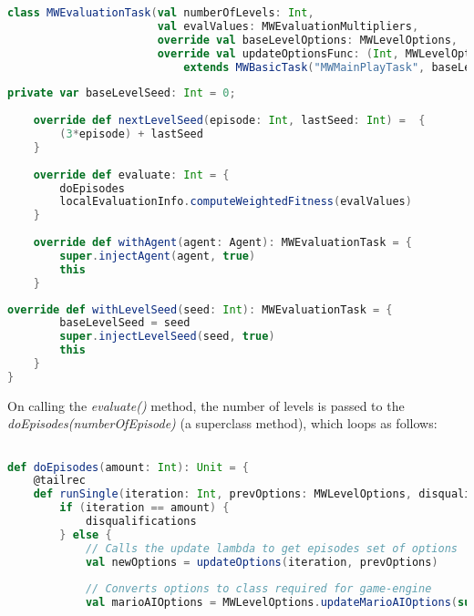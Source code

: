 \begin{minipage}{0.9\linewidth}
\centering
\begin{lstlisting}[language=scala]
class MWEvaluationTask(val numberOfLevels: Int, 
                       val evalValues: MWEvaluationMultipliers, 
                       override val baseLevelOptions: MWLevelOptions, 
                       override val updateOptionsFunc: (Int, MWLevelOptions) => MWLevelOptions)
                           extends MWBasicTask("MWMainPlayTask", baseLevelOptions, updateOptionsFunc, visualisation, args) with EvaluationTask {
\end{lstlisting}
\end{minipage}     
    
\begin{minipage}{0.9\linewidth}
\centering
\begin{lstlisting}[language=scala]  
    private var baseLevelSeed: Int = 0;
    
    override def nextLevelSeed(episode: Int, lastSeed: Int) =  {
        (3*episode) + lastSeed
    }    
        
    override def evaluate: Int = {
        doEpisodes
        localEvaluationInfo.computeWeightedFitness(evalValues)
    }
  
    override def withAgent(agent: Agent): MWEvaluationTask = {
        super.injectAgent(agent, true)
        this
    }
\end{lstlisting}
\end{minipage}     
    
\begin{minipage}{0.9\linewidth}
\centering
\begin{lstlisting}[language=scala]   
    override def withLevelSeed(seed: Int): MWEvaluationTask = {
        baseLevelSeed = seed
        super.injectLevelSeed(seed, true)
        this
    }
}
\end{lstlisting}
\end{minipage}  

On calling the \emph{evaluate()} method, the number of levels is passed to the \emph{doEpisodes(numberOfEpisode)} (a superclass method), which loops as follows:

\begin{minipage}{0.9\linewidth}
\centering
\begin{lstlisting}[language=scala]

def doEpisodes(amount: Int): Unit = {
    @tailrec
    def runSingle(iteration: Int, prevOptions: MWLevelOptions, disqualifications: Int): Int = {
        if (iteration == amount) { 
            disqualifications
        } else {
            // Calls the update lambda to get episodes set of options
            val newOptions = updateOptions(iteration, prevOptions)
          
            // Converts options to class required for game-engine
            val marioAIOptions = MWLevelOptions.updateMarioAIOptions(super.options, newOptions)
\end{lstlisting}
\end{minipage}     
    
